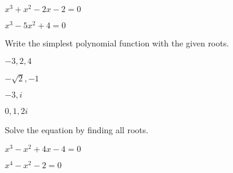 \documentclass{report}
\theoremstyle{definition}
\begin{document}
\begin{enumerate}
	\vspace{4cm}
	
	\begin{minipage}[t]{0.45\linewidth}
		\item $x^3+x^2-2x-2=0$
	\end{minipage}
	\hfill
	\begin{minipage}[t]{0.45\linewidth}
		\item $x^3-5x^2+4=0$
	\end{minipage}




\vfill

 \newpage

\hspace{-2cm} Write the simplest polynomial function with the given roots.

	\begin{minipage}[t]{0.45\linewidth}
		\item $-3, 2, 4$
	\end{minipage}
	\hfill
	\begin{minipage}[t]{0.45\linewidth}
		\item $-\sqrt{2},-1$
	\end{minipage}
	
	\vspace{4cm}
	
	\begin{minipage}[t]{0.45\linewidth}
		\item $-3, i$
	\end{minipage}
	\hfill
	\begin{minipage}[t]{0.45\linewidth}
		\item $0,1,2i$
	\end{minipage}
	
		\vspace{4cm}
	
\hspace{-2cm} Solve the equation by finding all roots.
	
	\begin{minipage}[t]{0.45\linewidth}
		\item $x^3-x^2+4x-4=0$
	\end{minipage}
	\hfill
	\begin{minipage}[t]{0.45\linewidth}
		\item $x^4-x^2-2=0$
	\end{minipage}
	

\end{enumerate}
\end{document}
